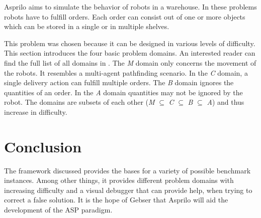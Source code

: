 \documentclass[runningheads]{llncs}
\newcommand{\authorquote}{Gebser \etal}
\begin{document}
Asprilo aims to simulate the behavior of robots in a warehouse. In these problems robots have to fulfill orders. Each order can consist out of one or more objects which can be stored in a single or in multiple shelves. 

This problem was chosen because it can be designed in various levels of difficulty. This section introduces the four basic problem domains. An interested reader can find the full list of all domains in \cite{gebser2018experimenting}. The \textit{M} domain only concerns the movement of the robots. It resembles a multi-agent pathfinding scenario. In the \textit{C} domain, a single delivery action can fulfill multiple orders. The \textit{B} domain ignores the quantities of an order. In the \textit{A} domain quantities may not be ignored by the robot. The domains are subsets of each other (\textit{M} $\subseteq$ \textit{C} $\subseteq$ \textit{B} $\subseteq$ \textit{A})  and thus increase in difficulty. 



\section{Conclusion} \label{sec:conclusion}

The framework discussed provides the bases for a variety of possible benchmark instances. Among other things, it provides different problem domains with increasing difficulty and a visual debugger that can provide help, when trying to correct a false solution. It is the hope of \authorquote{}       that Asprilo will aid the development of the ASP paradigm. 
\end{document}
